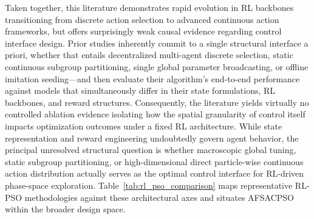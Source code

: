 \documentclass[final,5p,times]{elsarticle}
\begin{document}
Taken together, this literature demonstrates rapid evolution in RL backbones transitioning from discrete action selection to advanced continuous action frameworks, but offers surprisingly weak causal evidence regarding control interface design. 
Prior studies inherently commit to a single structural interface a priori, whether that entails decentralized multi-agent discrete selection, static continuous subgroup partitioning, single global parameter broadcasting, or offline imitation seeding—and then evaluate their algorithm's end-to-end performance against models that simultaneously differ in their state formulations, RL backbones, and reward structures. 
Consequently, the literature yields virtually no controlled ablation evidence isolating how the spatial granularity of control itself impacts optimization outcomes under a fixed RL architecture. 
While state representation and reward engineering undoubtedly govern agent behavior, the principal unresolved structural question is whether macroscopic global tuning, static subgroup partitioning, or high-dimensional direct particle-wise continuous action distribution actually serves as the optimal control interface for RL-driven phase-space exploration. 
Table~\ref{tab:rl_pso_comparison} maps representative RL-PSO methodologies against these architectural axes and situates AFSACPSO within the broader design space.
\end{document}
